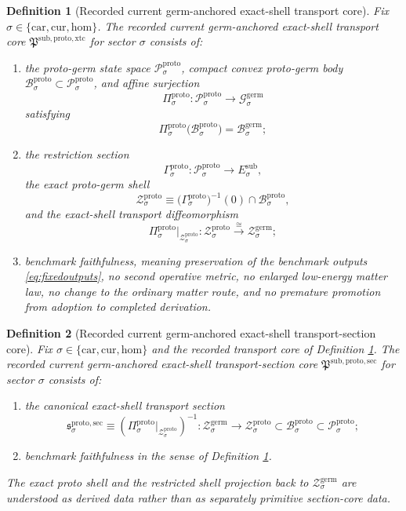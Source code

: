 \documentclass[11pt]{article}
\newcommand{\Car}{\mathrm{car}}
\newcommand{\Cur}{\mathrm{cur}}
\newcommand{\Hom}{\mathrm{hom}}
\newcommand{\SubTarget}[1]{E_{#1}^{\mathrm{sub}}}
\newcommand{\GermState}[1]{\mathcal G_{#1}^{\mathrm{germ}}}
\newcommand{\GermBody}[1]{\mathcal B_{#1}^{\mathrm{germ}}}
\newcommand{\GermShell}[1]{\mathcal Z_{#1}^{\mathrm{germ}}}
\newcommand{\ProtoTransportCore}{\mathfrak P^{\mathrm{sub,proto,xtc}}}
\newcommand{\ProtoSectionCore}{\mathfrak P^{\mathrm{sub,proto,sec}}}
\newcommand{\ProtoState}[1]{\mathcal P_{#1}^{\mathrm{proto}}}
\newcommand{\ProtoBody}[1]{\mathcal B_{#1}^{\mathrm{proto}}}
\newcommand{\ProtoProj}[1]{\Pi_{#1}^{\mathrm{proto}}}
\newcommand{\ProtoSection}[1]{\Gamma_{#1}^{\mathrm{proto}}}
\newcommand{\ProtoShell}[1]{\mathcal Z_{#1}^{\mathrm{proto}}}
\newcommand{\ProtoTransportSec}[1]{\mathfrak s_{#1}^{\mathrm{proto,sec}}}
\newtheorem{definition}{Definition}
\begin{document}
\begin{definition}[Recorded current germ-anchored exact-shell transport core]
\label{def:core}
Fix \(\sigma\in\{\Car,\Cur,\Hom\}\). The recorded current germ-anchored exact-shell transport core \(\ProtoTransportCore\) for sector \(\sigma\) consists of:
\begin{enumerate}
    \item the proto-germ state space \(\ProtoState{\sigma}\), compact convex proto-germ body \(\ProtoBody{\sigma}\subset\ProtoState{\sigma}\), and affine surjection
    \[
    \ProtoProj{\sigma}:\ProtoState{\sigma}\to\GermState{\sigma}
    \]
    satisfying
    \[
    \ProtoProj{\sigma}\bigl(\ProtoBody{\sigma}\bigr)=\GermBody{\sigma};
    \]
    \item the restriction section
    \[
    \ProtoSection{\sigma}:\ProtoState{\sigma}\to\SubTarget{\sigma},
    \]
    the exact proto-germ shell
    \[
    \ProtoShell{\sigma}
    \equiv
    \bigl(\ProtoSection{\sigma}\bigr)^{-1}(0)\cap\ProtoBody{\sigma},
    \]
    and the exact-shell transport diffeomorphism
    \[
    \ProtoProj{\sigma}\big|_{\ProtoShell{\sigma}}
    :
    \ProtoShell{\sigma}
    \xrightarrow{\cong}
    \GermShell{\sigma};
    \]
    \item benchmark faithfulness, meaning preservation of the benchmark outputs \eqref{eq:fixedoutputs}, no second operative metric, no enlarged low-energy matter law, no change to the ordinary matter route, and no premature promotion from adoption to completed derivation.
\end{enumerate}
\end{definition}

\begin{definition}[Recorded current germ-anchored exact-shell transport-section core]
\label{def:sectioncore}
Fix \(\sigma\in\{\Car,\Cur,\Hom\}\) and the recorded transport core of Definition \ref{def:core}. The recorded current germ-anchored exact-shell transport-section core \(\ProtoSectionCore\) for sector \(\sigma\) consists of:
\begin{enumerate}
    \item the canonical exact-shell transport section
    \[
    \ProtoTransportSec{\sigma}
    \equiv
    \left(
    \ProtoProj{\sigma}\big|_{\ProtoShell{\sigma}}
    \right)^{-1}
    :
    \GermShell{\sigma}\to\ProtoShell{\sigma}\subset\ProtoBody{\sigma}\subset\ProtoState{\sigma};
    \]
    \item benchmark faithfulness in the sense of Definition \ref{def:core}.
\end{enumerate}
The exact proto shell and the restricted shell projection back to \(\GermShell{\sigma}\) are understood as derived data rather than as separately primitive section-core data.
\end{definition}
\end{document}

